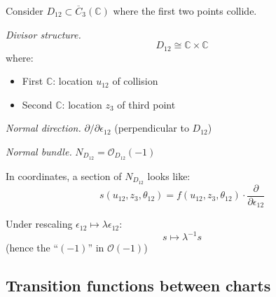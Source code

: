 \begin{example}\label{ex:normal-bundle-d12}
Consider $D_{12} \subset \overline{C}_3(\mathbb{C})$ where the first two points collide.

\emph{Divisor structure.}
\[D_{12} \cong \mathbb{C} \times \mathbb{C}\]
where:
\begin{itemize}
\item First $\mathbb{C}$: location $u_{12}$ of collision
\item Second $\mathbb{C}$: location $z_3$ of third point
\end{itemize}

\emph{Normal direction.} $\partial/\partial \epsilon_{12}$ (perpendicular to $D_{12}$)

\emph{Normal bundle.} $N_{D_{12}} = \mathcal{O}_{D_{12}}(-1)$

In coordinates, a section of $N_{D_{12}}$ looks like:
\[s(u_{12}, z_3, \theta_{12}) = f(u_{12}, z_3, \theta_{12}) \cdot \frac{\partial}{\partial \epsilon_{12}}\]

Under rescaling $\epsilon_{12} \mapsto \lambda \epsilon_{12}$:
\[s \mapsto \lambda^{-1} s\]
(hence the ``$(-1)$'' in $\mathcal{O}(-1)$)
\end{example}

\subsection{Transition functions between charts}

